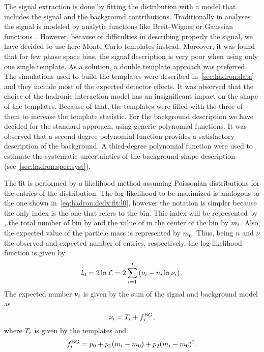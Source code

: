 The signal extraction is done by fitting the \minv distribution
with a model that includes the signal and the background contributions.
Traditionally in \NASixtyOne analyses the signal
is modeled by analytic functions like Breit-Wigner
or Gaussian functions~\cite{Abgrall:2015hmv,Aduszkiewicz:2015dmr}. 
However, because of difficulties in describing properly
the \kzeros signal, we have decided to use here
Monte Carlo templates instead. Moreover, it was found
that for few \kzeros phase space bins,
the signal description is very poor
when using only one single template.
As a solution, a double template approach
was preferred.
The simulations used to build the templates were described
in~\cref{sec:hadron:data} and they include most of the expected
detector effects. It was observed that the choice of the
hadronic interaction model has an insignificant impact
on the shape of the templates. Because of that,
the templates were filled with the three of them
to increase the template statistic.
For the background description we have decided
for the standard approach, using generic polynomial functions.
It was observed that a second-degree polynomial function
provides a satisfactory description of the background.
A third-degree polynomial function were used to estimate
the systematic uncertainties of the background shape description
(see~\cref{sec:hadron:spec:syst}).


The fit is performed by a likelihood method assuming Poissonian
distributions for the entries of the \minv distribution.
The log-likelihood to be maximized is analogous to the one shown
in~\cref{eq:hadron:dedx:fit:l0}, however the notation is
simpler because the only index is the one
that refers to the \minv bin. This index will be represented by \imass,
the total number of \minv bin by \nmass and the value of \minv in the center
of the bin by $m_i$. Also, the expected value of the particle mass
is represented by $m_0$.
Thus, being $n$ and $\nu$ the observed and expected number of entries,
respectively, the log-likelihood function is given by
\begin{equation}
  l_0 = 2\ln \mathcal{L} = 2\sum_{i=1}^{I} \left(\nu_{i} - n_{i}\ln\nu_{i}\right). 
  \label{eq:hadron:vzero:fit:l0}
\end{equation}
The expected number $\nu_i$ is given by the sum of the signal
and background model as
\begin{equation}
  \nu_i = T_i + f^\text{BG}_i, 
  \label{eq:hadron:vzero:fit:nu}
\end{equation}
where $T_i$ is given by the templates and
\begin{equation}
  f^\text{BG}_i = p_0 + p_1(m_i-m_0)+p_2(m_i-m_0)^2.
  \label{eq:hadron:vzero:fit:bg}
\end{equation}

